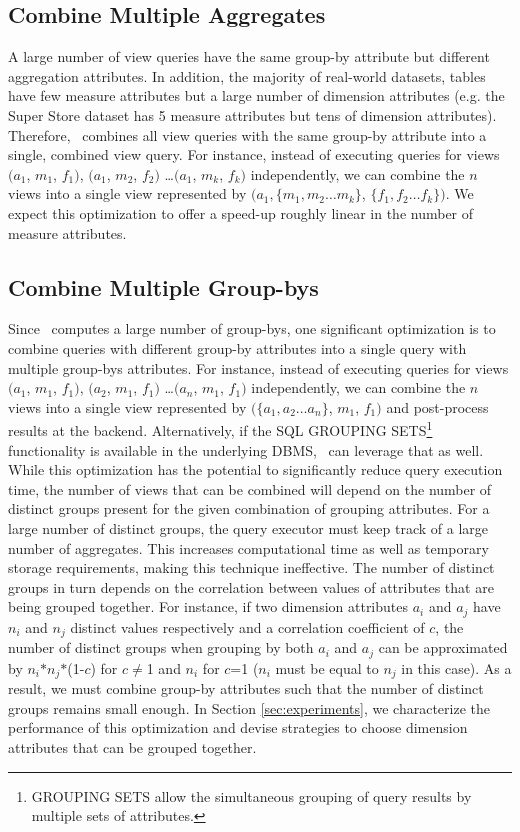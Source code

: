 \subsection {Combine Multiple Aggregates} 
A large number of view queries have the same group-by attribute but different
aggregation attributes. In addition, the majority of real-world datasets,
tables have few measure attributes but a large number of dimension attributes
(e.g. the Super Store dataset has 5 measure attributes but tens of dimension
attributes). Therefore, \SeeDB\ combines all view queries with the same group-by
attribute into a single, combined view query. For instance, instead of executing
queries for views $(a_1$, $m_1$, $f_1)$, $(a_1$, $m_2$, $f_2)$ \ldots $(a_1$, $m_k$, $f_k)$
independently, we can combine the $n$ views into a single view represented by
$(a_1, \{m_1, m_2\ldots m_k\}$, $\{f_1, f_2\ldots f_k\})$. We expect this
optimization to offer a speed-up roughly linear in the number of measure
attributes.

\subsection {Combine Multiple Group-bys}
\label{subsec:mult_gb}
  Since \SeeDB\ computes a large number of group-bys, one significant
  optimization is to combine queries with different group-by attributes into a
  single query with multiple group-bys attributes.
  For instance, instead of executing queries for views $(a_1$, $m_1$, $f_1)$,
  $(a_2$, $m_1$, $f_1)$ \ldots $(a_n$, $m_1$, $f_1)$ independently, we can
  combine the $n$ views into a single view represented by $(\{a_1, a_2\ldots
  a_n\}$, $m_1$, $f_1)$ and post-process results at the backend. Alternatively,
  if the SQL GROUPING SETS\footnote{GROUPING SETS allow the simultaneous
  grouping of query results by multiple sets of attributes.} functionality is
  available in the underlying DBMS, \SeeDB\ can leverage that as well.
  While this optimization has the potential to significantly reduce query
  execution time, the number of views that can be combined will depend on the
  number of distinct groups present for the given combination of grouping
  attributes. For a large number of distinct groups, the query executor must
  keep track of a large number of aggregates. This increases computational time
  as well as temporary storage requirements, making this technique ineffective.
  The number of distinct groups in turn depends on the correlation between
  values of attributes that are being grouped together. For instance, if two
  dimension attributes $a_i$ and $a_j$ have $n_i$ and $n_j$ distinct values
  respectively and a correlation coefficient of $c$, the number of distinct
  groups when grouping by both $a_i$ and $a_j$ can be approximated by
  $n_i$$\ast$$n_j$$\ast$(1-$c$) for $c$$\neq$1 and $n_i$ for $c$=1 ($n_i$ must
  be equal to $n_j$ in this case).
  As a result, we must combine group-by attributes such that the number of
  distinct groups remains small enough. In Section \ref{sec:experiments}, we
  characterize the performance of this optimization and devise strategies to
  choose dimension attributes that can be grouped together.
  
